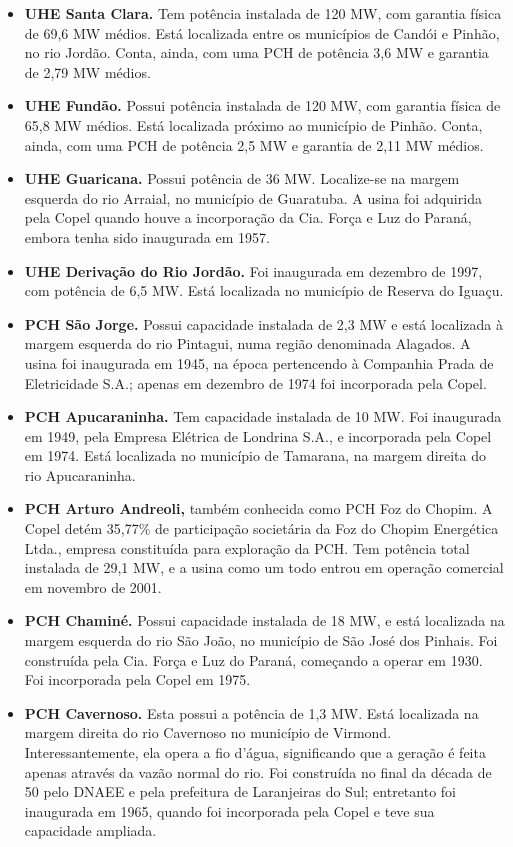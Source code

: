\documentclass[aprovado,numbers]{coppe}
\begin{document}
\begin{itemize}
  \item
    \textbf{UHE Santa Clara.} Tem potência instalada de 120 MW, com garantia física de 69,6 MW médios. Está localizada entre os municípios de Candói e Pinhão, no rio Jordão. Conta, ainda, com uma PCH de potência 3,6 MW e garantia de 2,79 MW médios.
  \item
    \textbf{UHE Fundão.} Possui potência instalada de 120 MW, com garantia física de 65,8 MW médios. Está localizada próximo ao município de Pinhão. Conta, ainda, com uma PCH de potência 2,5 MW e garantia de 2,11 MW médios.
  \item
    \textbf{UHE Guaricana.} Possui potência de 36 MW. Localize-se na margem esquerda do rio Arraial, no município de Guaratuba. A usina foi adquirida pela Copel quando houve a incorporação da Cia. Força e Luz do Paraná, embora tenha sido inaugurada em 1957.
  \item
    \textbf{UHE Derivação do Rio Jordão.} Foi inaugurada em dezembro de 1997, com potência de 6,5 MW. Está localizada no município de Reserva do Iguaçu.
  \item
    \textbf{PCH São Jorge.} Possui capacidade instalada de 2,3 MW e está localizada à margem esquerda do rio Pintagui, numa região denominada Alagados. A usina foi inaugurada em 1945, na época pertencendo à Companhia Prada de Eletricidade S.A.; apenas em dezembro de 1974 foi incorporada pela Copel.
  \item
    \textbf{PCH Apucaraninha.} Tem capacidade instalada de 10 MW. Foi inaugurada em 1949, pela Empresa Elétrica de Londrina S.A., e incorporada pela Copel em 1974. Está localizada no município de Tamarana, na margem direita do rio Apucaraninha.
  \item
    \textbf{PCH Arturo Andreoli,} também conhecida como PCH Foz do Chopim. A Copel detém 35,77\% de participação societária da Foz do Chopim Energética Ltda., empresa constituída para exploração da PCH. Tem potência total instalada de 29,1 MW, e a usina como um todo entrou em operação comercial em novembro de 2001.
  \item
    \textbf{PCH Chaminé.} Possui capacidade instalada de 18 MW, e está localizada na margem esquerda do rio São João, no município de São José dos Pinhais. Foi construída pela Cia. Força e Luz do Paraná, começando a operar em 1930. Foi incorporada pela Copel em 1975.
  \item
    \textbf{PCH Cavernoso.} Esta possui a potência de 1,3 MW. Está localizada na margem direita do rio Cavernoso no município de Virmond. Interessantemente, ela opera a fio d'água, significando que a geração é feita apenas através da vazão normal do rio. Foi construída no final da década de 50 pelo DNAEE e pela prefeitura de Laranjeiras do Sul; entretanto foi inaugurada em 1965, quando foi incorporada pela Copel e teve sua capacidade ampliada.

\end{itemize}
\end{document}
